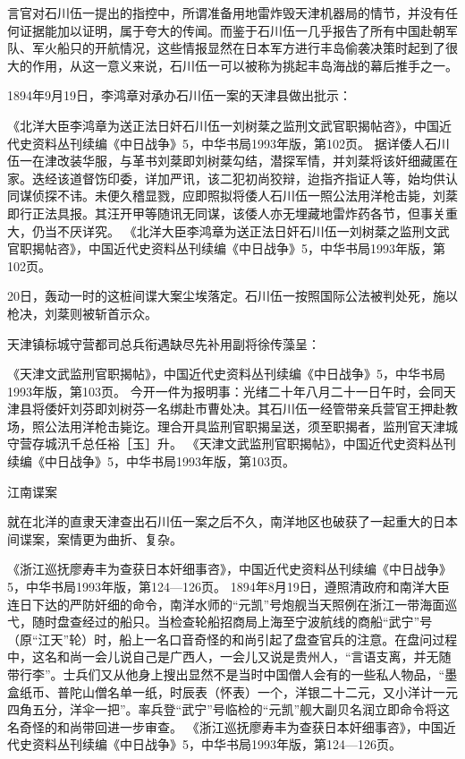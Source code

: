 \documentclass[12pt,UTF8]{ctexbook}
\begin{document}
言官对石川伍一提出的指控中，所谓准备用地雷炸毁天津机器局的情节，并没有任何证据能加以证明，属于夸大的传闻。而鉴于石川伍一几乎报告了所有中国赴朝军队、军火船只的开航情况，这些情报显然在日本军方进行丰岛偷袭决策时起到了很大的作用，从这一意义来说，石川伍一可以被称为挑起丰岛海战的幕后推手之一。

1894年9月19日，李鸿章对承办石川伍一案的天津县做出批示：

《北洋大臣李鸿章为送正法日奸石川伍一刘树棻之监刑文武官职揭帖咨》，中国近代史资料丛刊续编《中日战争》5，中华书局1993年版，第102页。
据详倭人石川伍一在津改装华服，与革书刘棻即刘树棻勾结，潜探军情，并刘棻将该奸细藏匿在家。迭经该道督饬印委，详加严讯，该二犯初尚狡辩，迨指齐指证人等，始均供认同谋侦探不讳。未便久稽显戮，应即照拟将倭人石川伍一照公法用洋枪击毙，刘棻即行正法具报。其汪开甲等随讯无同谋，该倭人亦无埋藏地雷炸药各节，但事关重大，仍当不厌详究。 《北洋大臣李鸿章为送正法日奸石川伍一刘树棻之监刑文武官职揭帖咨》，中国近代史资料丛刊续编《中日战争》5，中华书局1993年版，第102页。

20日，轰动一时的这桩间谍大案尘埃落定。石川伍一按照国际公法被判处死，施以枪决，刘棻则被斩首示众。

天津镇标城守营都司总兵衔遇缺尽先补用副将徐传藻呈：

《天津文武监刑官职揭帖》，中国近代史资料丛刊续编《中日战争》5，中华书局1993年版，第103页。
今开一件为报明事：光绪二十年八月二十一日午时，会同天津县将倭奸刘芬即刘树芬一名绑赴市曹处决。其石川伍一经管带亲兵营官王押赴教场，照公法用洋枪击毙讫。理合开具监刑官职揭呈送，须至职揭者，监刑官天津城守营存城汛千总任裕［玉］升。 《天津文武监刑官职揭帖》，中国近代史资料丛刊续编《中日战争》5，中华书局1993年版，第103页。

江南谍案

就在北洋的直隶天津查出石川伍一案之后不久，南洋地区也破获了一起重大的日本间谍案，案情更为曲折、复杂。

《浙江巡抚廖寿丰为查获日本奸细事咨》，中国近代史资料丛刊续编《中日战争》5，中华书局1993年版，第124—126页。
1894年8月19日，遵照清政府和南洋大臣连日下达的严防奸细的命令，南洋水师的“元凯”号炮舰当天照例在浙江一带海面巡弋，随时盘查经过的船只。当检查轮船招商局上海至宁波航线的商船“武宁”号（原“江天”轮）时，船上一名口音奇怪的和尚引起了盘查官兵的注意。在盘问过程中，这名和尚一会儿说自己是广西人，一会儿又说是贵州人，“言语支离，并无随带行李”。士兵们又从他身上搜出显然不是当时中国僧人会有的一些私人物品，“墨盒纸币、普陀山僧名单一纸，时辰表（怀表）一个，洋银二十二元，又小洋计一元四角五分，洋伞一把”。率兵登“武宁”号临检的“元凯”舰大副贝名润立即命令将这名奇怪的和尚带回进一步审查。 《浙江巡抚廖寿丰为查获日本奸细事咨》，中国近代史资料丛刊续编《中日战争》5，中华书局1993年版，第124—126页。
\end{document}
